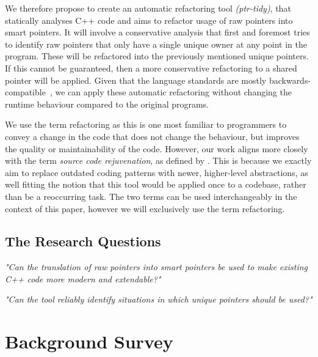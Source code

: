 \documentclass{proposal}
\begin{document}

    We therefore propose to create an automatic refactoring tool \emph{(ptr-tidy)}, that statically analyses C++ code and aims to refactor usage of raw pointers into smart pointers.
    It will involve a conservative analysis that first and foremost tries to identify raw pointers that only have a single unique owner at any point in the program.
    These will be refactored into the previously mentioned unique pointers.
    If this cannot be guaranteed, then a more conservative refactoring to a shared pointer will be applied.
    Given that the language standards are mostly backwards-compatible~\cite{Winters2020}, we can apply these automatic refactoring without changing the runtime behaviour compared to the original programs.

    We use the term refactoring as this is one most familiar to programmers to convey a change in the code that does not change the behaviour, but improves the quality or maintainability of the code.
    However, our work aligns more closely with the term \emph{source code rejuvenation}, as defined by \citet{Pirkelbauer2010}.
    This is because we exactly aim to replace outdated coding patterns with newer, higher-level abstractions, as well fitting the notion that this tool would be applied once to a codebase, rather than be a reoccurring task.
    The two terms can be used interchangeably in the context of this paper, however we will exclusively use the term refactoring.


    \subsection{The Research Questions}\label{subsec:the-research-questions}

    \emph{"Can the translation of raw pointers into smart pointers be used to make existing C++ code more modern and extendable?"}

    \emph{"Can the tool reliably identify situations in which unique pointers should be used?"}




    \section{Background Survey}\label{sec:background-survey}
\end{document}
